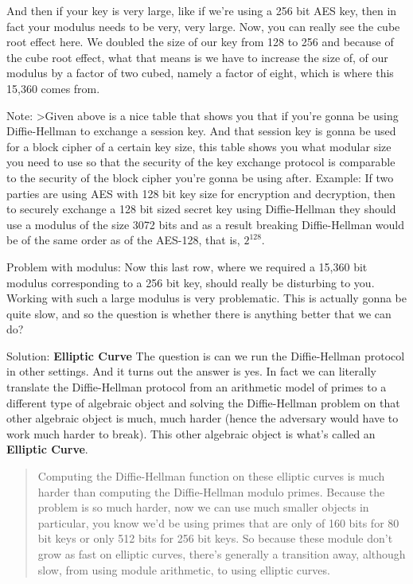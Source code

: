 \documentclass[11pt]{article}
\begin{document}
And then if your key is very large, like if we're using a 256 bit AES
key, then in fact your modulus needs to be very, very large. Now, you
can really see the cube root effect here. We doubled the size of our key
from 128 to 256 and because of the cube root effect, what that means is
we have to increase the size of, of our modulus by a factor of two
cubed, namely a factor of eight, which is where this 15,360 comes from.

Note: \textgreater{}Given above is a nice table that shows you that if
you're gonna be using Diffie-Hellman to exchange a session key. And that
session key is gonna be used for a block cipher of a certain key size,
this table shows you what modular size you need to use so that the
security of the key exchange protocol is comparable to the security of
the block cipher you're gonna be using after. Example: If two parties
are using AES with 128 bit key size for encryption and decryption, then
to securely exchange a 128 bit sized secret key using Diffie-Hellman
they should use a modulus of the size 3072 bits and as a result breaking
Diffie-Hellman would be of the same order as of the AES-128, that is,
\(2^{128}\).

Problem with modulus: Now this last row, where we required a 15,360 bit
modulus corresponding to a 256 bit key, should really be disturbing to
you. Working with such a large modulus is very problematic. This is
actually gonna be quite slow, and so the question is whether there is
anything better that we can do?

Solution: \textbf{Elliptic Curve} The question is can we run the
Diffie-Hellman protocol in other settings. And it turns out the answer
is yes. In fact we can literally translate the Diffie-Hellman protocol
from an arithmetic model of primes to a different type of algebraic
object and solving the Diffie-Hellman problem on that other algebraic
object is much, much harder (hence the adversary would have to work much
harder to break). This other algebraic object is what's called an
\textbf{Elliptic Curve}.

\begin{quote}
Computing the Diffie-Hellman function on these elliptic curves is much
harder than computing the Diffie-Hellman modulo primes. Because the
problem is so much harder, now we can use much smaller objects in
particular, you know we'd be using primes that are only of 160 bits for
80 bit keys or only 512 bits for 256 bit keys. So because these module
don't grow as fast on elliptic curves, there's generally a transition
away, although slow, from using module arithmetic, to using elliptic
curves.
\end{quote}
\end{document}
